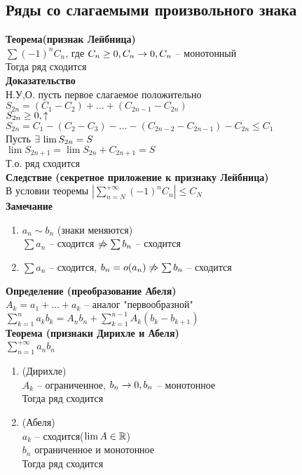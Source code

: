 \documentclass[12pt]{article}
\begin{document}
\subsection{Ряды со слагаемыми произвольного знака}
\textbf{Теорема(признак Лейбница)}\\
$\sum (-1)^nC_n$, где $C_n \geq 0, C_n \rightarrow 0, C_n$ -- монотонный\\
Тогда ряд сходится\\
\textbf{Доказательство}\\
Н.У,О. пусть первое слагаемое положительно\\
$S_{2n} = (C_1-C_2) + \ldots + (C_{2n-1} - C_{2n})$\\
$S_{2n} \geq 0, \uparrow$\\
$S_{2n} = C_1 - (C_2 - C_3) - \ldots - (C_{2n-2} - C_{2n-1}) - C_{2n} \leq C_1$\\
Пусть $\exists\, \lim S_{2n} = S$\\
$\lim S_{2n+1} = \lim S_{2n} + C_{2n+1} = S$\\
Т.о. ряд сходится\\
\textbf{Следствие (секретное приложение к признаку Лейбница)}\\
В условии теоремы $|\sum_{n=N}^{+\infty} (-1)^n C_n| \leq C_N$\\
\textbf{Замечание}
\begin{enumerate}
    \item $a_n \sim b_n$ (знаки меняются)\\
    $\sum a_n$ -- сходится $\not\Rightarrow \sum b_n$ -- сходится
    \item $\sum a_n$ -- сходится, $b_n = o(a_n) \not\Rightarrow \sum b_n$ -- сходится
\end{enumerate}
\textbf{Определение (преобразование Абеля)}\\
$A_k = a_1 + \ldots + a_k$ -- аналог "первообразной"\\
$\sum_{k=1}^n a_kb_k = A_nb_n + \sum_{k=1}^{n-1} A_k(b_k-b_{k+1})$\\
\textbf{Теорема (признаки Дирихле и Абеля)}\\
$\sum_{n=1}^{+\infty} a_nb_n$\\
\begin{enumerate}
    \item (Дирихле)\\
    $A_k$ -- ограниченное, $b_n \rightarrow 0, b_n$ -- монотонное\\
    Тогда ряд сходится
    \item (Абеля)\\
    $a_k$ -- сходится($\lim A \in \mathbb{R}$)\\
    $b_n$ ограниченное и монотонное\\
    Тогда ряд сходится
\end{enumerate}
\end{document}
